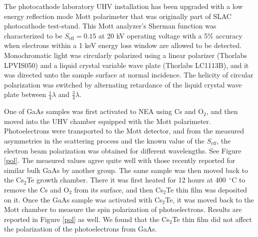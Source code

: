 The photocathode laboratory UHV installation has been upgraded with a low energy reflection mode Mott polarimeter that was originally part of SLAC photocathode test-stand.\cite{alley1995_StanfordLinearAccelerator} This Mott analyzer's Sherman function was characterized to be $S_\mathrm{eff}=0.15$ at 20 kV operating voltage with a 5\% accuracy when electrons within a 1 keV energy loss window are allowed to be detected.\cite{Mulhollan_SLAC}
Monochromatic light was circularly polarized using a linear polarizer (Thorlabs LPVIS050) and a liquid crystal variable wave plate (Thorlabs LC1113B), and it was directed unto the sample surface at normal incidence. The helicity of circular polarization was switched by alternating retardance of the liquid crystal wave plate between $\frac{1}{4}\lambda$ and $\frac{3}{4}\lambda$. %

One of GaAs samples was first activated to NEA using Cs and O$_2$, and then moved into the UHV chamber equipped with the Mott polarimeter. Photoelectrons were transported to the Mott detector, and from the measured asymmetries in the scattering process and the known value of the $S_\mathrm{eff}$, the electron beam polarization was obtained for different wavelengths. See Figure \ref{pol}. The measured values agree quite well with those recently reported for similar bulk GaAs by another group.\cite{liu2017_ComprehensiveEvaluationFactors} The same sample was then moved back to the Cs$_2$Te growth chamber. There it was first heated for 12 hours at 400~$^\circ$C to remove the Cs and O$_2$ from its surface, and then Cs$_2$Te thin film was deposited on it. Once the GaAs sample was activated with Cs$_2$Te, it was moved back to the Mott chamber to measure the spin polarization of photoelectrons. Results are reported in Figure \ref{pol} as well. We found that the Cs$_2$Te thin film did not affect the polarization of the photoelectrons from GaAs.


